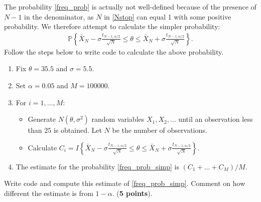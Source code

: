 \documentclass{scrartcl}
\renewcommand{\P}{{\mathbb P}}
\begin{document}
\begin{enumerate}
The probability \eqref{freq_prob} is actually not well-defined
 because of the presence of $N-1$ in the denominator, as $N$ in
 \eqref{Nstop} can equal 1 with some positive probability. We
 therefore attempt to calculate the simpler probability:
  \begin{align}\label{freq_prob_simp}
    \P\left\{\bar{X}_N -   \sigma  \frac{t_{N-1,
    \alpha/2}}{\sqrt{N}} \leq \theta \leq \bar{X}_N + \sigma    \frac{t_{N-1,
    \alpha/2}}{\sqrt{N}}  \right\}. 
  \end{align}
Follow the steps below to write code to calculate the above
probability.  
\begin{enumerate}
\item Fix $\theta = 35.5$ and $\sigma = 5.5$.
\item Set $\alpha = 0.05$ and $M = 100000$.
\item For $i = 1, \dots, M$:
  \begin{itemize}
  \item Generate $N(\theta,\sigma^2)$ random variables $X_1,
    X_2,\dots$ until an observation less than $25$ is obtained. Let
    $N$ be the number of observations.
  \item Calculate  $C_i = I\left\{\bar{X}_N -   \sigma  \frac{t_{N-1,
    \alpha/2}}{\sqrt{N}} \leq \theta \leq \bar{X}_N + \sigma    \frac{t_{N-1,
    \alpha/2}}{\sqrt{N}} \right\}$. 
\end{itemize}
\item The estimate for the probability \eqref{freq_prob_simp} is $(C_1
  + \dots + C_M)/M$. 
\end{enumerate}
Write code and compute this estimate of
\eqref{freq_prob_simp}. Comment on how different the estimate is from
$1 - \alpha$. (\textbf{5 points}).


\end{enumerate}
\end{document}
